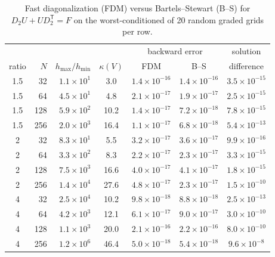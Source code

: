 \documentclass[11pt]{article}
\begin{document}
\begin{table}[htbp]\centering\small
\caption{Fast diagonalization (FDM) versus Bartels--Stewart (B--S) for $D_2U+UD_2^{\mathsf T}=F$ on the worst-conditioned of 20 random graded grids per row.}
\begin{tabular}{cr r c ccc}
\toprule
& & & & \multicolumn{2}{c}{backward error} & solution\\
ratio & $N$ & $h_{\max}/h_{\min}$ & $\kappa(V)$ & FDM & B--S & difference\\
\midrule
1.5 & 32 & $1.1{\times}10^{1}$ & 3.0 & $1.4{\times}10^{-16}$ & $1.4{\times}10^{-16}$ & $3.5{\times}10^{-15}$\\
1.5 & 64 & $4.5{\times}10^{1}$ & 4.8 & $2.1{\times}10^{-17}$ & $1.9{\times}10^{-17}$ & $2.5{\times}10^{-15}$\\
1.5 & 128 & $5.9{\times}10^{2}$ & 10.2 & $1.4{\times}10^{-17}$ & $7.2{\times}10^{-18}$ & $7.8{\times}10^{-15}$\\
1.5 & 256 & $2.0{\times}10^{3}$ & 16.4 & $1.1{\times}10^{-17}$ & $6.8{\times}10^{-18}$ & $5.4{\times}10^{-13}$\\
2 & 32 & $8.3{\times}10^{1}$ & 5.5 & $3.2{\times}10^{-17}$ & $3.6{\times}10^{-17}$ & $9.9{\times}10^{-16}$\\
2 & 64 & $3.3{\times}10^{2}$ & 8.3 & $2.2{\times}10^{-17}$ & $2.3{\times}10^{-17}$ & $3.3{\times}10^{-15}$\\
2 & 128 & $7.5{\times}10^{3}$ & 16.6 & $4.0{\times}10^{-17}$ & $4.1{\times}10^{-17}$ & $1.8{\times}10^{-15}$\\
2 & 256 & $1.4{\times}10^{4}$ & 27.6 & $4.8{\times}10^{-17}$ & $2.3{\times}10^{-17}$ & $1.5{\times}10^{-10}$\\
4 & 32 & $2.5{\times}10^{4}$ & 10.2 & $9.8{\times}10^{-18}$ & $8.8{\times}10^{-18}$ & $2.5{\times}10^{-13}$\\
4 & 64 & $4.2{\times}10^{3}$ & 12.1 & $6.1{\times}10^{-17}$ & $9.0{\times}10^{-17}$ & $3.0{\times}10^{-10}$\\
4 & 128 & $1.1{\times}10^{3}$ & 20.0 & $2.1{\times}10^{-16}$ & $2.2{\times}10^{-16}$ & $8.0{\times}10^{-10}$\\
4 & 256 & $1.2{\times}10^{6}$ & 46.4 & $5.0{\times}10^{-18}$ & $5.4{\times}10^{-18}$ & $9.6{\times}10^{-8}$\\
\bottomrule
\end{tabular}
\end{table}
\end{document}
